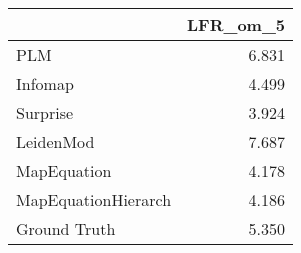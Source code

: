 \begin{tabular}{lr}
\toprule
{} & LFR_om_5 \\
\midrule
PLM                 &    6.831 \\
Infomap             &    4.499 \\
Surprise            &    3.924 \\
LeidenMod           &    7.687 \\
MapEquation         &    4.178 \\
MapEquationHierarch &    4.186 \\
Ground Truth        &    5.350 \\
\bottomrule
\end{tabular}
